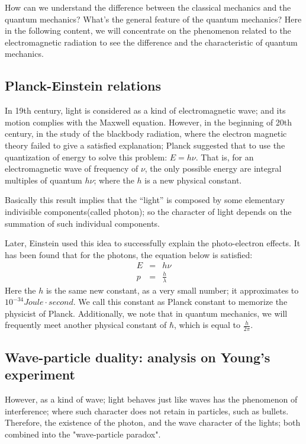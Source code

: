 How can we understand the difference between the classical mechanics
and the quantum mechanics? What's the general feature of the quantum
mechanics? Here in the following content, we will concentrate on the
phenomenon related to the electromagnetic radiation to see the
difference and the characteristic of quantum mechanics.

\subsection{Planck-Einstein relations}
%
%
%
In 19th century, light is considered as a kind of electromagnetic
wave; and its motion complies with the Maxwell equation. However, in
the beginning of 20th century, in the study of the blackbody
radiation, where the electron magnetic theory failed to give a
satisfied explanation; Planck suggested that to use the quantization
of energy to solve this problem: $E = h\nu$. That is, for an
electromagnetic wave of frequency of $\nu$, the only possible energy
are integral multiples of quantum $h\nu$; where the $h$ is a
new physical constant.

Basically this result implies that the ``light'' is composed by some
elementary indivisible components(called photon); so the character
of light depends on the summation of such individual components.

Later, Einstein used this idea to successfully explain the
photo-electron effects. It has been found that for the photons, the
equation below is satisfied:
\begin{eqnarray}\label{BASICeq:1}
  E &=& h\nu \nonumber \\
  p &=& \frac{h}{\lambda}
\end{eqnarray}
Here the $h$ is the same new constant, as a very small number; it
approximates to $10^{-34}Joule\cdot second$. We call this constant as
Planck constant to memorize the physicist of Planck. Additionally, we
note that in quantum mechanics, we will frequently meet another
physical constant of $\hbar$, which is equal to $\frac{h}{2\pi}$.

\subsection{Wave-particle duality: analysis on Young's
experiment}\label{sec:WPDAOYE_in_basic}
%
%
However, as a kind of wave; light behaves just like waves has the
phenomenon of interference; where such character does not retain in
particles, such as bullets.  Therefore, the existence of the photon,
and the wave character of the lights; both combined into the
"wave-particle paradox".

